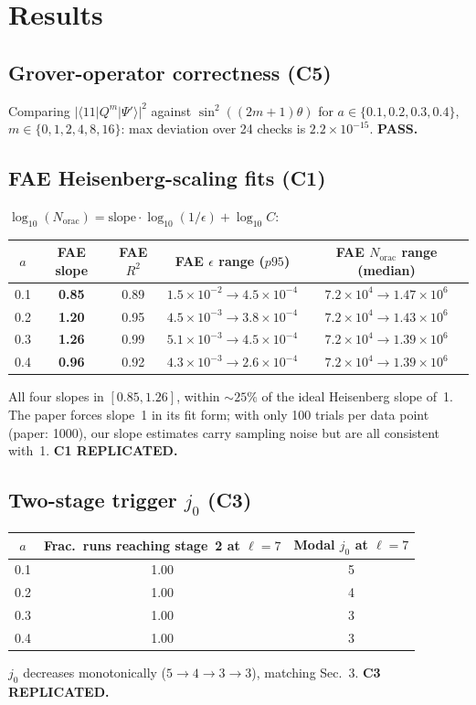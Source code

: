 \documentclass[11pt]{article}
\begin{document}
\section{Results}

\subsection{Grover-operator correctness (C5)}
Comparing $|\langle 11|Q^{m}|\Psi'\rangle|^{2}$ against $\sin^{2}((2m+1)\theta)$ for $a \in \{0.1, 0.2, 0.3, 0.4\}$, $m \in \{0, 1, 2, 4, 8, 16\}$: max deviation over 24 checks is $2.2\times 10^{-15}$. \textbf{PASS.}

\subsection{FAE Heisenberg-scaling fits (C1)}
$\log_{10}(N_{\mathrm{orac}}) = \mathrm{slope}\cdot\log_{10}(1/\epsilon) + \log_{10}C$:

\begin{center}
\begin{tabular}{c c c c c}
\toprule
$a$ & FAE slope & FAE $R^{2}$ & FAE $\epsilon$ range ($p95$) & FAE $N_{\mathrm{orac}}$ range (median) \\
\midrule
0.1 & \textbf{0.85} & 0.89 & $1.5\times 10^{-2}\!\to\!4.5\times 10^{-4}$ & $7.2\times 10^{4}\!\to\!1.47\times 10^{6}$ \\
0.2 & \textbf{1.20} & 0.95 & $4.5\times 10^{-3}\!\to\!3.8\times 10^{-4}$ & $7.2\times 10^{4}\!\to\!1.43\times 10^{6}$ \\
0.3 & \textbf{1.26} & 0.99 & $5.1\times 10^{-3}\!\to\!4.5\times 10^{-4}$ & $7.2\times 10^{4}\!\to\!1.39\times 10^{6}$ \\
0.4 & \textbf{0.96} & 0.92 & $4.3\times 10^{-3}\!\to\!2.6\times 10^{-4}$ & $7.2\times 10^{4}\!\to\!1.39\times 10^{6}$ \\
\bottomrule
\end{tabular}
\end{center}

All four slopes in $[0.85, 1.26]$, within $\sim 25\%$ of the ideal Heisenberg slope of~1. The paper forces slope~1 in its fit form; with only 100 trials per data point (paper: 1000), our slope estimates carry sampling noise but are all consistent with~1. \textbf{C1 REPLICATED.}

\subsection{Two-stage trigger $j_{0}$ (C3)}
\begin{center}
\begin{tabular}{c c c}
\toprule
$a$ & Frac.\ runs reaching stage~2 at $\ell = 7$ & Modal $j_{0}$ at $\ell = 7$ \\
\midrule
0.1 & 1.00 & 5 \\
0.2 & 1.00 & 4 \\
0.3 & 1.00 & 3 \\
0.4 & 1.00 & 3 \\
\bottomrule
\end{tabular}
\end{center}
$j_{0}$ decreases monotonically ($5\!\to\!4\!\to\!3\!\to\!3$), matching Sec.~3. \textbf{C3 REPLICATED.}
\end{document}
